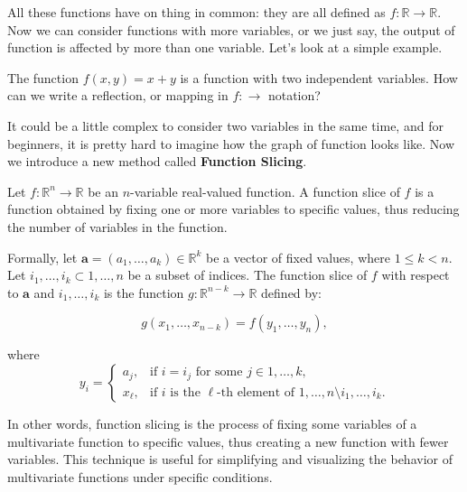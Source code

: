 All these functions have on thing in common: they are all defined as $f: \mathbb{R}\rightarrow \mathbb{R}$. Now we can consider functions with more variables, or we just
say, the output of  function is affected by more than one variable. Let's look at a simple example.

\begin{example}
	The function $f(x,y)=x+y$ is a function with two independent variables. How can we write a reflection, or mapping in $f: \rightarrow$ notation?
	
	\begin{solution}
		It could be a little complex to consider two variables in the same time, and for beginners, it is pretty hard to imagine how the graph of  function looks like.
		Now we introduce a new method called \textbf{Function Slicing}.
		\begin{definition}
			Let $f: \mathbb{R}^n \to \mathbb{R}$ be an $n$-variable real-valued function. A function slice of $f$ is a function obtained by fixing one or more variables to specific values, thus reducing the number of variables in the function.
			
			Formally, let $\mathbf{a} = (a_1, \ldots, a_k) \in \mathbb{R}^k$ be a vector of fixed values, where $1 \leq k < n$. Let ${i_1, \ldots, i_k} \subset {1, \ldots, n}$ be a subset of indices. The function slice of $f$ with respect to $\mathbf{a}$ and ${i_1, \ldots, i_k}$ is the function $g: \mathbb{R}^{n-k} \to \mathbb{R}$ defined by:
			
			\[
			g(x_1, \ldots, x_{n-k}) = f(y_1, \ldots, y_n),
			\]
			
			where
			\[
			y_i =
			\begin{cases}
				a_j, & \text{if } i = i_j \text{ for some } j \in {1, \ldots, k}, \\
				x_{\ell}, & \text{if } i \text{ is the } \ell\text{-th element of } {1, \ldots, n} \setminus {i_1, \ldots, i_k}.
			\end{cases}
			\]
			\begin{remark}
				In other words, function slicing is the process of fixing some variables of a multivariate function to specific values, thus creating a new function with fewer variables. This technique is useful for simplifying and visualizing the behavior of multivariate functions under specific conditions. 
			\end{remark}
		\end{definition}
		

\end{solution}
\end{example}
